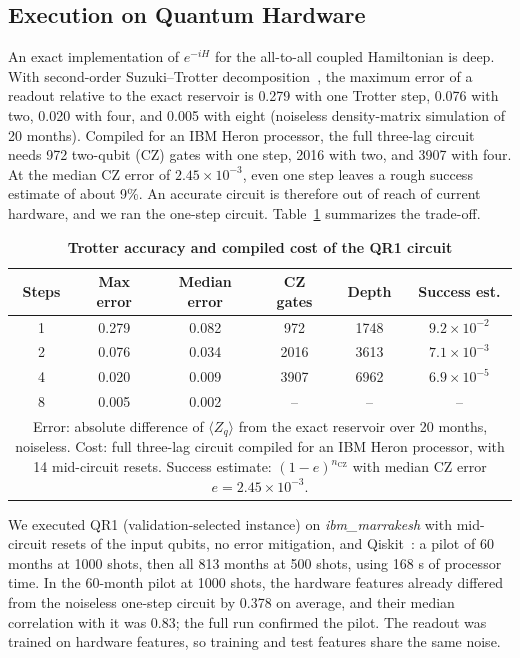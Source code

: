 \documentclass{ieeeaccess}
\begin{document}
\subsection{Execution on Quantum Hardware}
\label{sec:res-hw}
An exact implementation of $e^{-iH}$ for the all-to-all coupled Hamiltonian is deep. With second-order Suzuki--Trotter decomposition~\cite{suzuki1991}, the maximum error of a readout relative to the exact reservoir is 0.279 with one Trotter step, 0.076 with two, 0.020 with four, and 0.005 with eight (noiseless density-matrix simulation of 20 months). Compiled for an IBM Heron processor, the full three-lag circuit needs 972 two-qubit (CZ) gates with one step, 2016 with two, and 3907 with four. At the median CZ error of $2.45\times10^{-3}$, even one step leaves a rough success estimate of about 9\%. An accurate circuit is therefore out of reach of current hardware, and we ran the one-step circuit. Table~\ref{tab:trotter} summarizes the trade-off.

\begin{table}[t]
\caption{\textbf{Trotter accuracy and compiled cost of the QR1 circuit}}
\label{tab:trotter}
\setlength{\tabcolsep}{3pt}
\begin{tabular}{|c|c|c|c|c|c|}
\hline
Steps & Max error & Median error & CZ gates & Depth & Success est.\\
\hline
1 & 0.279 & 0.082 & 972 & 1748 & $9.2\times10^{-2}$\\
2 & 0.076 & 0.034 & 2016 & 3613 & $7.1\times10^{-3}$\\
4 & 0.020 & 0.009 & 3907 & 6962 & $6.9\times10^{-5}$\\
8 & 0.005 & 0.002 & -- & -- & --\\
\hline
\multicolumn{6}{p{240pt}}{Error: absolute difference of $\langle Z_q\rangle$ from the exact reservoir over 20 months, noiseless. Cost: full three-lag circuit compiled for an IBM Heron processor, with 14 mid-circuit resets. Success estimate: $(1-e)^{n_\mathrm{CZ}}$ with median CZ error $e=2.45\times10^{-3}$.}\\
\end{tabular}
\end{table}

We executed QR1 (validation-selected instance) on \emph{ibm\_marrakesh} with mid-circuit resets of the input qubits, no error mitigation, and Qiskit~\cite{qiskit2024}: a pilot of 60 months at 1000 shots, then all 813 months at 500 shots, using 168 s of processor time. In the 60-month pilot at 1000 shots, the hardware features already differed from the noiseless one-step circuit by 0.378 on average, and their median correlation with it was 0.83; the full run confirmed the pilot. The readout was trained on hardware features, so training and test features share the same noise.
\end{document}
